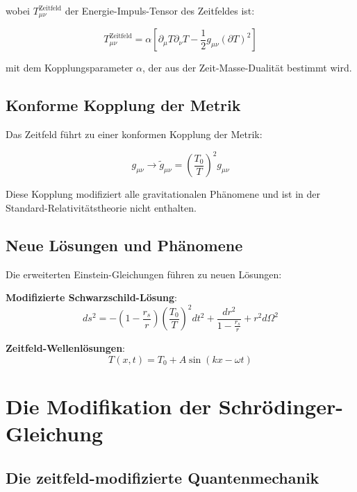 \documentclass[12pt,a4paper]{report}
\begin{document}
	wobei $T_{\mu\nu}^{\text{Zeitfeld}}$ der Energie-Impuls-Tensor des Zeitfeldes ist:
	
	\begin{equation}
		T_{\mu\nu}^{\text{Zeitfeld}} = \alpha[\partial_\mu T \partial_\nu T - \frac{1}{2}g_{\mu\nu}(\partial T)^2]
	\end{equation}
	
	mit dem Kopplungsparameter $\alpha$, der aus der Zeit-Masse-Dualität bestimmt wird.
	
	\subsection{Konforme Kopplung der Metrik}
	
	Das Zeitfeld führt zu einer konformen Kopplung der Metrik:
	
	\begin{equation}
		g_{\mu\nu} \to \tilde{g}_{\mu\nu} = \left(\frac{T_0}{T}\right)^2 g_{\mu\nu}
	\end{equation}
	
	Diese Kopplung modifiziert alle gravitationalen Phänomene und ist in der Standard-Relativitätstheorie nicht enthalten.
	
	\subsection{Neue Lösungen und Phänomene}
	
	Die erweiterten Einstein-Gleichungen führen zu neuen Lösungen:
	
	\textbf{Modifizierte Schwarzschild-Lösung}:
	\begin{equation}
		ds^2 = -\left(1-\frac{r_s}{r}\right)\left(\frac{T_0}{T}\right)^2 dt^2 + \frac{dr^2}{1-\frac{r_s}{r}} + r^2d\Omega^2
	\end{equation}
	
	\textbf{Zeitfeld-Wellenlösungen}:
	\begin{equation}
		T(x,t) = T_0 + A \sin(kx - \omega t)
	\end{equation}
	
	\section{Die Modifikation der Schrödinger-Gleichung}
	
	\subsection{Die zeitfeld-modifizierte Quantenmechanik}
	
\end{document}
